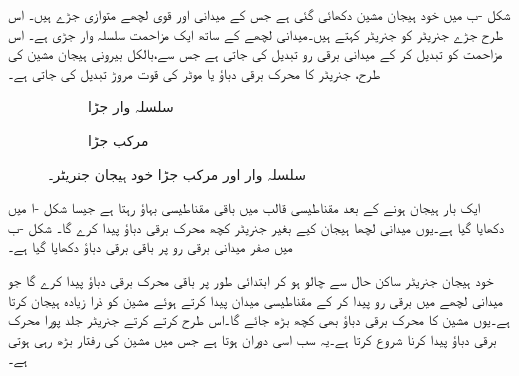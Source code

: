 شکل -ب میں خود ہیجان مشین دکھائی گئی ہے جس کے میدانی اور قوی لچھے متوازی جڑے ہیں۔ اس طرح جڑے جنریٹر کو  جنریٹر کہتے ہیں۔میدانی لچھے کے ساتھ ایک مزاحمت سلسلہ وار جڑی ہے۔ اس مزاحمت  کو تبدیل کر کے میدانی برقی رو تبدیل کی جاتی ہے جس سے،بالکل بیرونی ہیجان مشین کی طرح، جنریٹر کا محرک برقی دباؤ یا موٹر کی قوت مروڑ تبدیل کی جاتی ہے۔
\begin{figure}
\centering
\begin{subfigure}{0.45\textwidth}
\centering
{}
\caption{سلسلہ وار جڑا}
\end{subfigure}%
\begin{subfigure}{0.45\textwidth}
\centering
{}
\caption{مرکب جڑا}
\end{subfigure}
\caption{سلسلہ وار اور مرکب جڑا خود ہیجان جنریٹر۔}
\label{شکل_یکسمتی_سلسلہ_وار_اور_مرکب}
\end{figure}
 ایک بار ہیجان ہونے کے بعد مقناطیسی قالب میں  باقی مقناطیسی بہاؤ رہتا ہے جیسا شکل -ا میں دکھایا گیا ہے۔یوں میدانی لچھا ہیجان کیے بغیر جنریٹر کچھ  محرک برقی دباؤ پیدا کرے گا۔   شکل -ب میں   صفر میدانی برقی رو پر باقی برقی دباؤ   دکھایا گیا ہے۔

 خود ہیجان جنریٹر ساکن حال سے چالو ہو کر  ابتدائی طور پر باقی محرک برقی دباؤ پیدا کرے گا جو میدانی لچھے میں برقی رو پیدا کر کے  مقناطیسی میدان پیدا کرتے ہوئے  مشین کو ذرا زیادہ ہیجان کرتا ہے۔یوں مشین کا محرک برقی دباؤ بھی کچھ بڑھ جائے گا۔اس طرح کرتے کرتے جنریٹر جلد پورا محرک برقی دباؤ پیدا کرنا شروع کرتا ہے۔یہ سب اسی دوران  ہوتا ہے جس میں مشین کی رفتار بڑھ رہی ہوتی ہے۔

